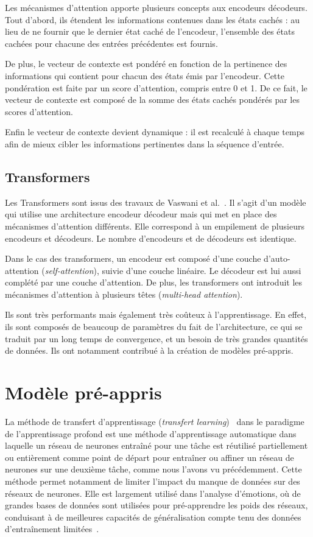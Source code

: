 Les mécanismes d'attention apporte plusieurs concepts aux encodeurs décodeurs. Tout d'abord, ils étendent les informations contenues dans les états cachés : au lieu de ne fournir que le dernier état caché de l'encodeur, l'ensemble des états cachées pour chacune des entrées précédentes est fournis.

De plus, le vecteur de contexte est pondéré en fonction de la pertinence des informations qui contient pour chacun des états émis par l'encodeur. Cette pondération est faite par un score d'attention, compris entre 0 et 1. De ce fait, le vecteur de contexte est composé de la somme des états cachés pondérés par les scores d'attention.

Enfin le vecteur de contexte devient dynamique : il est recalculé à chaque temps afin de mieux cibler les informations pertinentes dans la séquence d'entrée.

\subsection{Transformers}

Les Transformers sont issus des travaux de Vaswani et al.~\cite{Vaswani2017}. Il s’agit d’un modèle qui utilise une architecture encodeur décodeur mais qui met en place des mécanismes d’attention différents. Elle correspond à un empilement de plusieurs encodeurs et décodeurs. Le nombre d’encodeurs et de décodeurs est identique.

Dans le cas des transformers, un encodeur est composé d’une couche d’auto-attention (\textit{self-attention}), suivie d’une couche linéaire. Le décodeur est lui aussi complété par une couche d’attention. De plus, les transformers ont introduit les mécanismes d’attention à plusieurs têtes (\textit{multi-head attention}).

Ils sont très performants mais également très coûteux à l'apprentissage. En effet, ils sont composés de beaucoup de paramètres du fait de l'architecture, ce qui se traduit par un long temps de convergence, et un besoin de très grandes quantités de données. Ils ont notamment contribué à la création de modèles pré-appris.


\section{Modèle pré-appris}

La méthode de transfert d'apprentissage (\textit{transfert learning})~\cite{Goodfellow2016} dans le paradigme de l'apprentissage profond est une méthode d'apprentissage automatique dans laquelle un réseau de neurones entraîné pour une tâche est réutilisé partiellement ou entièrement comme point de départ pour entraîner ou affiner un réseau de neurones sur une deuxième tâche, comme nous l'avons vu précédemment. Cette méthode permet notamment de limiter l'impact du manque de données sur des réseaux de neurones.
Elle est largement utilisé dans l'analyse d'émotions, où de grandes bases de données sont utilisées pour pré-apprendre les poids des réseaux, conduisant à de meilleures capacités de généralisation compte tenu des données d’entraînement limitées~\cite{Dong2018}.

